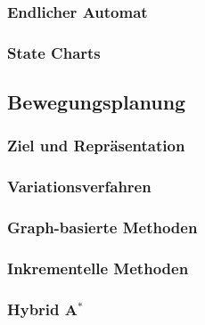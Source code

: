 \documentclass[a4paper]{article}
\begin{document}
\subsubsection{Endlicher Automat}

\subsubsection{State Charts}

\subsection{Bewegungsplanung}

\subsubsection{Ziel und Repräsentation}

\subsubsection{Variationsverfahren}

\subsubsection{Graph-basierte Methoden}

\subsubsection{Inkrementelle Methoden}

\subsubsection{Hybrid A$^*$}
\end{document}
